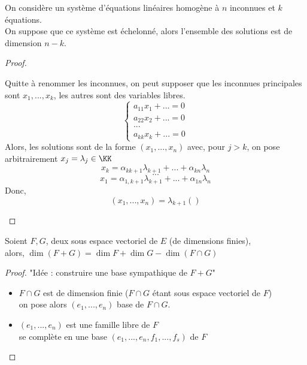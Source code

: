 \documentclass[../main.tex]{subfile}
\begin{document}
\begin{theo}
	On considère un système d'équations linéaires homogène à $n$ inconnues et $k$ équations.\\
	On suppose que ce système est échelonné, alors l'ensemble des solutions est de dimension $n-k$.
\end{theo}
\begin{proof}
\begin{rema}	
	Quitte à renommer les inconnues, on peut supposer que les inconnues principales sont $x_1, ..., x_k$, les autres sont des variables libres.\\
	$$
\left\{
\begin{array}{r}
	a_{11}x_1 + ... = 0\\
	a_{22}x_2 + ... = 0\\
	...\\
	a_{kk}x_k + ... = 0
\end{array}
\right.
	$$
	Alors, les solutions sont de la forme $(x_1, ..., x_n)$ avec,
	pour $j > k$, on pose arbitrairement $x_j = \lambda_j \in \KK$\\
	$$x_k = \alpha_{k k+1} \lambda_{k+1} + ... + \alpha_{kn}\lambda_n$$
	$$...$$
	$$x_1 = \alpha_{1, k+1} \lambda_{k+1} + ... + \alpha_{1n}\lambda_n$$
	Donc, 
	$$
(x_1, ..., x_n) = \lambda_{k+1}()
	$$
\end{rema}

\end{proof}

\begin{theo}
	Soient $F, G$, deux sous espace vectoriel de $E$ (de dimensions finies), \\
	alors, $\dim(F + G) = \dim F + \dim G - \dim(F \cap G)$
\end{theo}

\begin{proof}
	"Idée : construire une base sympathique de $F + G$"
\begin{itemize}	
	
	\item $F\cap G$ est de dimension finie ($F \cap G$ étant sous espace vectoriel de $F$) \\
	on pose alors $(e_1, ..., e_n)$ base de $F \cap G$.

	\item $(e_1, ..., e_n)$ est une famille libre de $F$\\
	se complète en une base $(e_1, ..., e_n, f_1, ..., f_s)$ de $F$
\end{itemize}
\end{proof}
\end{document}
